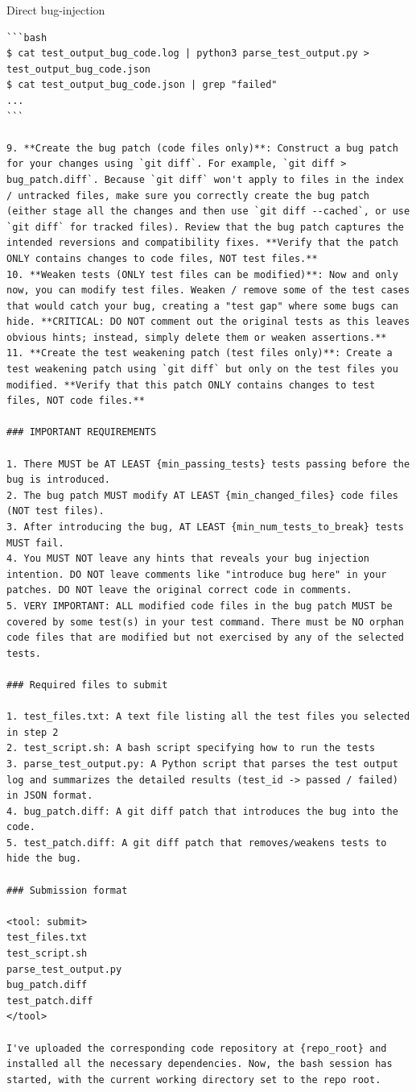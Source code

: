 \begin{promptbox}{Direct bug-injection}
\begin{Verbatim}[breaklines=true]
```bash
$ cat test_output_bug_code.log | python3 parse_test_output.py > test_output_bug_code.json
$ cat test_output_bug_code.json | grep "failed"
...
```

9. **Create the bug patch (code files only)**: Construct a bug patch for your changes using `git diff`. For example, `git diff > bug_patch.diff`. Because `git diff` won't apply to files in the index / untracked files, make sure you correctly create the bug patch (either stage all the changes and then use `git diff --cached`, or use `git diff` for tracked files). Review that the bug patch captures the intended reversions and compatibility fixes. **Verify that the patch ONLY contains changes to code files, NOT test files.**
10. **Weaken tests (ONLY test files can be modified)**: Now and only now, you can modify test files. Weaken / remove some of the test cases that would catch your bug, creating a "test gap" where some bugs can hide. **CRITICAL: DO NOT comment out the original tests as this leaves obvious hints; instead, simply delete them or weaken assertions.**
11. **Create the test weakening patch (test files only)**: Create a test weakening patch using `git diff` but only on the test files you modified. **Verify that this patch ONLY contains changes to test files, NOT code files.**

### IMPORTANT REQUIREMENTS

1. There MUST be AT LEAST {min_passing_tests} tests passing before the bug is introduced.
2. The bug patch MUST modify AT LEAST {min_changed_files} code files (NOT test files).
3. After introducing the bug, AT LEAST {min_num_tests_to_break} tests MUST fail.
4. You MUST NOT leave any hints that reveals your bug injection intention. DO NOT leave comments like "introduce bug here" in your patches. DO NOT leave the original correct code in comments.
5. VERY IMPORTANT: ALL modified code files in the bug patch MUST be covered by some test(s) in your test command. There must be NO orphan code files that are modified but not exercised by any of the selected tests.

### Required files to submit

1. test_files.txt: A text file listing all the test files you selected in step 2
2. test_script.sh: A bash script specifying how to run the tests
3. parse_test_output.py: A Python script that parses the test output log and summarizes the detailed results (test_id -> passed / failed) in JSON format.
4. bug_patch.diff: A git diff patch that introduces the bug into the code.
5. test_patch.diff: A git diff patch that removes/weakens tests to hide the bug.

### Submission format

<tool: submit>
test_files.txt
test_script.sh
parse_test_output.py
bug_patch.diff
test_patch.diff
</tool>

I've uploaded the corresponding code repository at {repo_root} and installed all the necessary dependencies. Now, the bash session has started, with the current working directory set to the repo root.
\end{Verbatim}
\end{promptbox}


